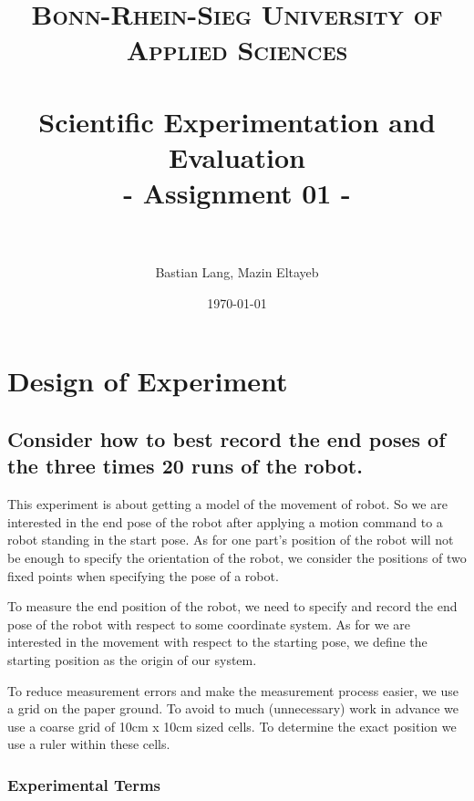\documentclass[paper=a4, fontsize=11pt]{scrartcl} %
\title{	
\normalfont \normalsize 
\textsc{Bonn-Rhein-Sieg University of Applied Sciences} \\ [25pt] %
\horrule{0.5pt} \\[0.4cm] %
\huge Scientific Experimentation and Evaluation\\
- Assignment 01 - \\ %
\horrule{2pt} \\[0.5cm] %
}
\author{Bastian Lang, Mazin Eltayeb} %
\date{\normalsize\today} %
\numberwithin{equation}{section} %
\numberwithin{figure}{section} %
\numberwithin{table}{section} %
\begin{document}
\maketitle %

\tableofcontents
\newpage

\section{Design of Experiment}
\subsection{Consider how to best record the end poses of the three times 20 runs of the robot.}
This experiment is about getting a model of the movement of robot. 
So we are interested in the end pose of the robot after applying a motion command to a robot standing in the start pose. 
As for one part's position of the robot will not be enough to specify the orientation of the robot, we consider the positions of two fixed points when specifying the pose of a robot.

To measure the end position of the robot, we need to specify and record the end pose of the robot with respect to some coordinate system. 
As for we are interested in the movement with respect to the starting pose, we define the starting position as the origin of our system.

To reduce measurement errors and make the measurement process easier, we use a grid on the paper ground. 
To avoid to much (unnecessary) work in advance we use a coarse grid of 10cm x 10cm sized cells. 
To determine the exact position we use a ruler within these cells.

\subsubsection{Experimental Terms}
\end{document}
